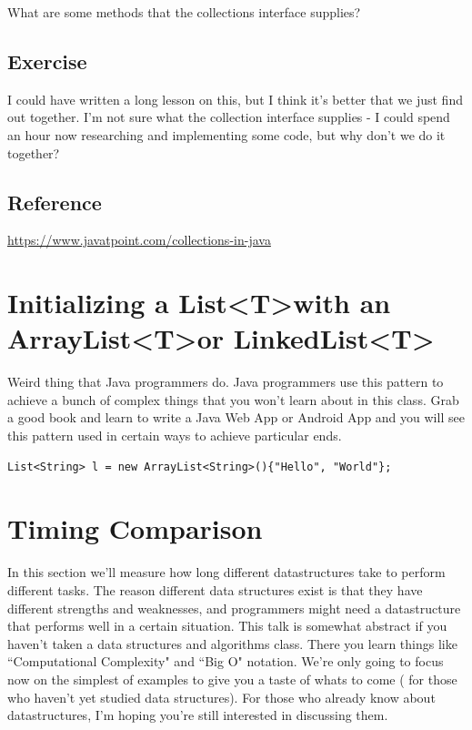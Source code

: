 \documentclass[10pt]{article}
\begin{document}
What are some methods that the  collections interface supplies?

\subsection{Exercise}
I could have written a long lesson on this, but I think it's better that we just find out together. I'm not sure what the collection interface supplies - I could spend an hour now researching and implementing some code, but why don't we do it together?

\subsection{Reference}

\url{https://www.javatpoint.com/collections-in-java}

\section{Initializing a List\textless T\textgreater with an ArrayList\textless T\textgreater or LinkedList\textless T\textgreater}
Weird thing that Java programmers do. Java programmers use this pattern to achieve a bunch of complex things that you won't learn about in this class. Grab a good book and learn to write a Java Web App or Android App and you will see this pattern used in certain ways to achieve particular ends.

\begin{lstlisting}[style=java]
List<String> l = new ArrayList<String>(){"Hello", "World"};
\end{lstlisting}

\section{Timing Comparison}
In this section we'll measure how long different datastructures take to perform different tasks. The reason different data structures exist is that they have different strengths and weaknesses, and programmers might need a datastructure that performs well in a certain situation. This talk is somewhat abstract if you haven't taken  a data structures and algorithms class. There you learn things like ``Computational Complexity" and ``Big O" notation. We're only going to focus now on the simplest of examples to give you a taste of whats to come ( for those who haven't yet studied data structures). For those who already know about datastructures, I'm hoping you're still interested in discussing them.
\end{document}
